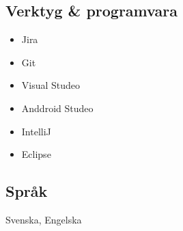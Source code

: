 \documentclass{article}
\begin{document}
\begin{minipage}[t]{0.28\textwidth}
\subsection*{\textcolor{colorBlue}{Verktyg \& programvara}}
\begin{itemize}
  \item Jira
  \item Git
  \item Visual Studeo
  \item Anddroid Studeo
  \item IntelliJ
  \item Eclipse
\end{itemize}
\vspace{-10pt} %
\subsection*{\textcolor{colorBlue}{Språk}}
Svenska, Engelska
\end{minipage}
\end{document}
